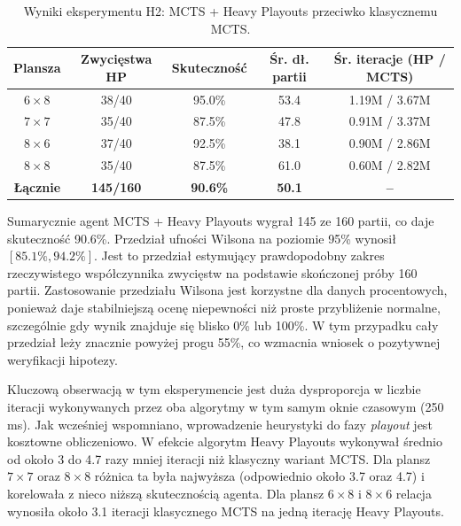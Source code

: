 \documentclass{article}
\begin{document}
\begin{table}[H]
    \centering
    \caption{Wyniki eksperymentu H2: MCTS + Heavy Playouts przeciwko klasycznemu MCTS.}
    \label{tab:h2-summary}
    \renewcommand{\arraystretch}{1.2}
    \begin{tabular}{|c|c|c|c|c|}
        \hline
        \textbf{Plansza} & \textbf{Zwycięstwa HP} & \textbf{Skuteczność} & \textbf{Śr. dł. partii} & \textbf{Śr. iteracje (HP / MCTS)} \\
        \hline
        $6 \times 8$ & 38/40 & 95.0\% & 53.4 & 1.19M / 3.67M \\
        $7 \times 7$ & 35/40 & 87.5\% & 47.8 & 0.91M / 3.37M \\
        $8 \times 6$ & 37/40 & 92.5\% & 38.1 & 0.90M / 2.86M \\
        $8 \times 8$ & 35/40 & 87.5\% & 61.0 & 0.60M / 2.82M \\
        \hline
        \textbf{Łącznie} & \textbf{145/160} & \textbf{90.6\%} & \textbf{50.1} & \textbf{--} \\
        \hline
    \end{tabular}
\end{table}

\noindent
Sumarycznie agent MCTS + Heavy Playouts wygrał 145 ze 160 partii, co daje skuteczność 90.6\%. Przedział ufności Wilsona na poziomie 95\% wynosił $[85.1\%, 94.2\%]$. Jest to przedział estymujący prawdopodobny zakres rzeczywistego współczynnika zwycięstw na podstawie skończonej próby 160 partii. Zastosowanie przedziału Wilsona jest korzystne dla danych procentowych, ponieważ daje stabilniejszą ocenę niepewności niż proste przybliżenie normalne, szczególnie gdy wynik znajduje się blisko 0\% lub 100\%. W tym przypadku cały przedział leży znacznie powyżej progu 55\%, co wzmacnia wniosek o pozytywnej weryfikacji hipotezy.

Kluczową obserwacją w tym eksperymencie jest duża dysproporcja w liczbie iteracji wykonywanych przez oba algorytmy w tym samym oknie czasowym (250 ms). Jak wcześniej wspomniano, wprowadzenie heurystyki do fazy \textit{playout} jest kosztowne obliczeniowo. W efekcie algorytm Heavy Playouts wykonywał średnio od około 3 do 4.7 razy mniej iteracji niż klasyczny wariant MCTS. Dla plansz $7 \times 7$ oraz $8 \times 8$ różnica ta była najwyższa (odpowiednio około 3.7 oraz 4.7) i korelowała z nieco niższą skutecznością agenta. Dla plansz $6 \times 8$ i $8 \times 6$ relacja wynosiła około 3.1 iteracji klasycznego MCTS na jedną iterację Heavy Playouts.
\end{document}
